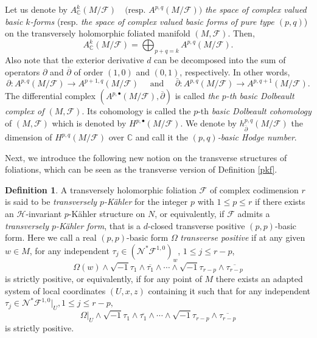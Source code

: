 \documentclass[12pt]{amsart}
\numberwithin{equation}{section}
\theoremstyle{definition}
\theoremstyle{definition}
\newtheorem{definition}  [theorem]     {Definition}
\theoremstyle{definition}
\renewcommand{\1}{\mathsf{1}}
\renewcommand{\>}{\rightarrow}
\newcommand{\bp}{\overline\partial}
\def\mb{\mathbb}
\def\mc{\mathcal}
\theoremstyle{plain} %
\theoremstyle{plain} %
\theoremstyle{plain} %
\begin{document}
Let us denote by
	$A^k_\mathbb{C}(M/\mathcal F)\quad \text{(resp. $A ^{p,q}(M/\mathcal F)$)}$
	\textit{the space of complex valued basic $k$-forms} (resp. \textit{the space of complex valued basic forms of pure type $(p,q)$}) on the transversely holomorphic foliated manifold $(M,\mc F).$ Then,
	$$A_{\mathbb{C}}^{k}(M/\mathcal{F})=\bigoplus_{p+q=k} A^{p, q}(M/\mathcal{F}).$$
	Also note that the exterior derivative $d$  can be decomposed into the sum of operators $\partial$ and $\bp$ of order $(1,0)$ and $(0,1)$, respectively. In other words,
	\begin{equation*}\label{partial and barpartial}
		\partial:A^{p, q}(M/\mathcal F) \longrightarrow A^{p+1, q}(M/\mathcal F) \quad \text { and } \quad \bar{\partial}: A^{p, q}(M/\mathcal F)\longrightarrow A^{p, q+1}(M/\mathcal F).
	\end{equation*}
	The differential complex $(A^{p,\bullet}(M/\mc F),\bp)$ is called \textit{the $p$-th basic Dolbeault complex of $(M,\mc F)$}. Its cohomology is called the $p$-th  \emph{basic Dolbeault cohomology} of $(M,\mc F)$ which is denoted by $H^{p,\bullet}(M/\mc F)$. We denote by $h^{p,q}_{\bp}(M/\mc F)$ the dimension of $H^{p,q}(M/\mc F)$ over $\mb C$ and call it the \emph{$(p,q)$-basic Hodge number}.
	
	
	
	Next, we introduce the following new notion on the transverse structures of foliations, which can be seen as the transverse version of
	Definition \ref{pkf}. %
	
	\begin{definition}\label{TRAN P-Kahler}
		A transversely holomorphic  foliation $\mc F$ of complex codimension $r$ is said to be \textit{transversely $p$-K\"ahler} for the integer $p$ with $1\leq p\leq r$ if there exists an $\mathcal{H}$-invariant $p$-K\"ahler structure   on $N$, or equivalently, if $\mc F$ admits a \textit{transversely $p$-K\"ahler form}, that is a $d$-closed transverse positive $(p,p)$-basic form. Here we call a real $(p,p)$-basic form $\Omega$ \textit{transverse positive}  if at any given $w\in M$, for any independent $\tau_j\in(\mathcal N^{*} \mathcal{F}^{1,0})_w$, $1\leq j\leq {r-p}$,
		$$\Omega(w)\wedge\sqrt{-1}\tau_1\wedge\overline{\tau_1}\wedge\cdots\wedge\sqrt{-1}\tau_{r-p}\wedge\overline{\tau_{r-p}}$$
		is strictly positive, or equivalently, if for any point of $M$ there exists an adapted system of local coordinates $(U,x,z)$ containing it such that
		for any independent $\tau_j\in \mathcal N^{*} \mathcal{F}^{1,0}|_U, 1\leq j\leq{r-p},$
		$$\Omega|_U\wedge\sqrt{-1}\tau_1\wedge\overline{\tau_1}\wedge\cdots\wedge\sqrt{-1}\tau_{r-p}\wedge\overline{\tau_{r-p}}$$
		is strictly positive.
	\end{definition}
	
\end{document}
